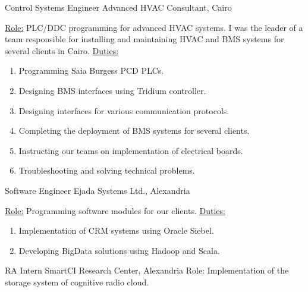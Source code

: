 \documentclass[letterpaper]{twentysecondcv} %
\begin{document}
\begin{twenty}
               {Control Systems Engineer}
               {Advanced HVAC Consultant, Cairo}
               {\underline{Role:}\newline
                PLC/DDC programming for advanced HVAC systems.
                I was the leader of a team responsible for installing and maintaining HVAC and BMS systems
                for several clients in Cairo.\newline
                \underline{Duties:}
                \begin{enumerate}
                    \item{Programming Saia Burgess PCD PLCs.}
                    \item{Designing BMS interfaces using Tridium controller.}
                    \item{Designing interfaces for various communication protocols.}
                    \item{Completing the deployment of BMS systems for several clients.}
                    \item{Instructing our teams on implementation of electrical boards.}
                    \item{Troubleshooting and solving technical problems.}
                \end{enumerate}
               }

               {Software Engineer}
               {Ejada Systems Ltd., Alexandria}
               {\underline{Role:}\newline
                Programming software modules for our clients.\newline
                \underline{Duties:}
                \begin{enumerate}
                    \item Implementation of CRM systems using Oracle Siebel.
                    \item Developing BigData solutions using Hadoop and Scala.
                \end{enumerate}}

               {RA Intern}
               {SmartCI Research Center, Alexandria}
               {Role: Implementation of the storage system of cognitive radio cloud.}

\end{twenty}
\end{document}
